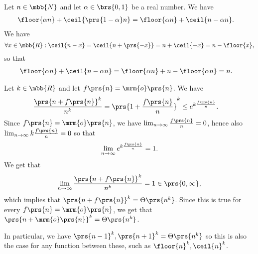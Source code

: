\documentclass[oneside]{scrbook}
\theoremstyle{definition}
\begin{document}
\begin{exercise}
    Let $n \in \mbb{N}$ and let $\alpha \in \brs{0,1}$ be a real number. We have
    \begin{align*}
        \floor{\alpha n} + \ceil{\prs{1- \alpha}n}
        &= \floor{\alpha n} + \ceil{n - \alpha n} \text{.}
    \end{align*}
    We have \[\forall x \in \mbb{R}: \ceil{n - x} = \ceil{n + \prs{-x}} = n + \ceil{-x} = n - \floor{x} \text{,} \] so that
    \begin{align*}
        \floor{\alpha n} + \ceil{n - \alpha n} &= \floor{\alpha n} + n - \floor{\alpha n}
        = n \text{.}
    \end{align*}
\end{exercise}

\begin{exercise}
    Let $k \in \mbb{R}$ and let $f\prs{n} = \mrm{o}\prs{n}$. We have
    \begin{align*}
        \frac{\prs{n + f\prs{n}}^k}{n^k} &= \prs{1 + \frac{f\prs{n}}{n}}^k
        \leq e^{k \frac{f\prs{n}}{n}} \text{.}
    \end{align*}
    Since $f\prs{n} = \mrm{o}\prs{n}$, we have $\lim_{n\to\infty} \frac{f\prs{n}}{n} = 0$, hence also $\lim_{n\to\infty} k \frac{f\prs{n}}{n} = 0$ so that
    \[\lim_{n\to\infty} e^{k \frac{f\prs{n}}{n}} = 1 \text{.}\]
    We get that
    \[\lim_{n\to\infty} \frac{\prs{n + f\prs{n}}^k}{n^k} = 1 \in \prs{0, \infty} \text{,}\]
    which implies that $\prs{n + f\prs{n}}^k = \Theta\prs{n^k}$. Since this is true for every $f\prs{n} = \mrm{o}\prs{n}$, we get that $\prs{n + \mrm{o}\prs{n}}^k = \Theta\prs{n^k}$.

    In particular, we have $\prs{n - 1}^k, \prs{n + 1}^k = \Theta\prs{n^k}$ so this is also the case for any function between these, such as $\floor{n}^k, \ceil{n}^k$.

\end{exercise}
\end{document}
